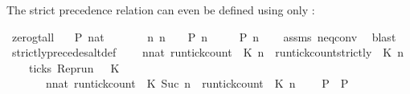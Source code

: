 \begin{isabellebody}
\begin{isamarkuptext}%
The strict precedence relation can even be defined using 
  only :%
\end{isamarkuptext}\isamarkuptrue%
\isamarkupfalse%
\ zero{\isacharunderscore}gt{\isacharunderscore}all{\isacharcolon}\isanewline
\ \ \ {\isacartoucheopen}P\ {\isacharparenleft}{}{\isacharcolon}{\isacharcolon}nat{\isacharparenright}{\isacartoucheclose}\isanewline
\ \ \ \ \ \ \ {\isacartoucheopen}{\isasymAnd}n{\isachardot}\ n\ {\isachargreater}\ {}\ {\isasymLongrightarrow}\ P\ n{\isacartoucheclose}\isanewline
\ \ \ \ \ {\isacartoucheopen}P\ n{\isacartoucheclose}\isanewline
%
\isadelimproof
\ \ %
\endisadelimproof
%
\isatagproof
{}\isamarkupfalse%
\ assms\ neq{}{\isacharunderscore}conv\ \isamarkupfalse%
\ blast%
\endisatagproof
{\isafoldproof}%
%
\isadelimproof
\isanewline
%
\endisadelimproof
\isanewline
{}\isamarkupfalse%
\ strictly{\isacharunderscore}precedes{\isacharunderscore}alt{\isacharunderscore}def{}{\isacharcolon}\isanewline
\ \ {\isacartoucheopen}{\isacharbraceleft}\ {\isasymrho}{\isachardot}\ {\isasymforall}n{\isacharcolon}{\isacharcolon}nat{\isachardot}\ {\isacharparenleft}run{\isacharunderscore}tick{\isacharunderscore}count\ {\isasymrho}\ K\ n{\isacharparenright}\ {\isasymle}\ {\isacharparenleft}run{\isacharunderscore}tick{\isacharunderscore}count{\isacharunderscore}strictly\ {\isasymrho}\ K\ n{\isacharparenright}\ {\isacharbraceright}\isanewline
\ {\isacharequal}\ {\isacharbraceleft}\ {\isasymrho}{\isachardot}\ {\isacharparenleft}{\isasymnot}ticks\ {\isacharparenleft}{\isacharparenleft}Rep{\isacharunderscore}run\ {\isasymrho}{\isacharparenright}\ {}\ K\isanewline
\ \ \ \ \ \ {\isasymand}\ {\isacharparenleft}{\isasymforall}n{\isacharcolon}{\isacharcolon}nat{\isachardot}\ {\isacharparenleft}run{\isacharunderscore}tick{\isacharunderscore}count\ {\isasymrho}\ K\ {\isacharparenleft}Suc\ n{\isacharparenright}{\isacharparenright}\ {\isasymle}\ {\isacharparenleft}run{\isacharunderscore}tick{\isacharunderscore}count\ {\isasymrho}\ K\ n{\isacharparenright}{\isacharparenright}\ {\isacharbraceright}{\isacartoucheclose}\isanewline
\ \ {\isacharparenleft}\ {\isacartoucheopen}{\isacharquery}P\ {\isacharequal}\ {\isacharquery}P{\isacharprime}{\isacartoucheclose}{\isacharparenright}\isanewline

\end{isabellebody}

